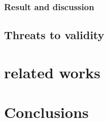 \documentclass{sig-alternate}
\begin{document}

\subsubsection{Result and discussion}


\subsection{Threats to validity}


\section{related works}


\section{Conclusions}




%

%
%
%
\end{document}
